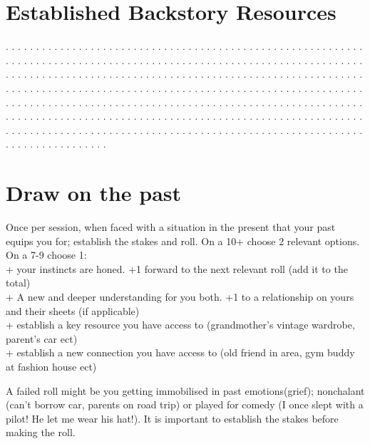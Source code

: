 \documentclass[letterpaper]{twentysecondcv} %
\begin{document}
\section{Established Backstory Resources}
{. . . . . . . . . . . . . . . . . . . . . . . . . . . . . . . . . . . . . . . . . . . . . . . . . . . . . . . . . . . . . . . . . . . . . . . . . . . . . . . . . . . . . . . . . . . . . . . . . . . . . . . . . . . . . . . . . . . . . . . . . . . . . . . . . . . . . . . . . . . . . . . . . . . . . . . . . . . . . . . . . . . . . . . . . . . . . . . . . . . . . . . . . . . . . . . . . . . . . . . . . . . . . . . . . . . . . . .}
{. . . . . . . . . . . . . . . . . . . . . . . . . . . . . . . . . . . . . . . . . . . . . . . . . . . . . . . . . . . . . . . . . . . . . . . . . . . . . . . . . . . . . . . . . . . . . . . . . . . . . . . . . . . . . . . . . . . . . . . . . . . . . . . . . . . . . . . . . . . . . . . . . . . . . . . . . . . . . . . . . . . . . . . . . . . . . . . . . . . . . . . . . . . . . . . . . . . . . . . . . . . . . . . . . . . . . . .}




\newpage %


\section{Draw on the past}
Once per session, when faced with a situation in the present that your past equips you for; establish the stakes and roll.
On a 10+ choose 2 relevant options. On a 7-9 choose 1: \\
+ your instincts are honed. +1 forward to the next relevant roll (add it to the total)\\
+ A new and deeper understanding for you both. +1 to a relationship on yours and their sheets (if applicable)\\
+ establish a key resource you have access to (grandmother's vintage wardrobe, parent's car ect)\\
+ establish a new connection you have access to (old friend in area, gym buddy at fashion house ect)

A failed roll might be you getting immobilised in past emotions(grief); nonchalant (can't borrow car, parents on road trip) or played for comedy (I once slept with a pilot! He let me wear his hat!). It is important to establish the stakes before making the roll.
\end{document}
